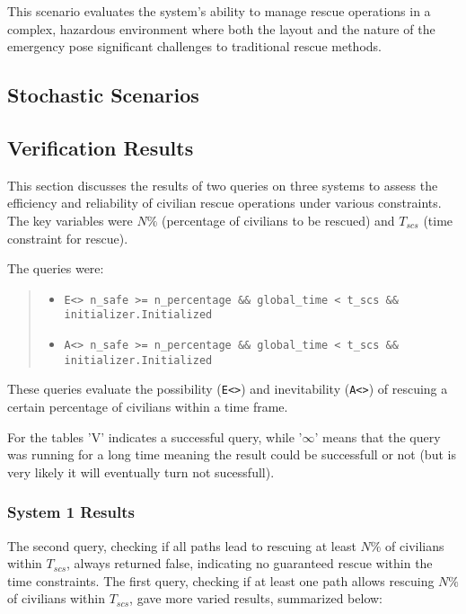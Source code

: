This scenario evaluates the system's ability to manage rescue operations in a complex, hazardous environment where both the layout and the nature of the emergency pose significant challenges to traditional rescue methods.
\subsection{Stochastic Scenarios}

\subsection{Verification Results}

This section discusses the results of two queries on three systems to assess the efficiency and reliability of civilian rescue operations under various constraints. The key variables were $N\%$ (percentage of civilians to be rescued) and $T_{scs}$ (time constraint for rescue).

The queries were:


\begin{quote}
	\raggedright
	\begin{itemize}
		\item \texttt{E<> n\_safe >= n\_percentage \&\& global\_time < t\_scs \&\& initializer.Initialized}
		\item \texttt{A<> n\_safe >= n\_percentage \&\& global\_time < t\_scs \&\& initializer.Initialized}
	\end{itemize}
\end{quote}

These queries evaluate the possibility (\texttt{E<>}) and inevitability (\texttt{A<>}) of rescuing a certain percentage of civilians within a time frame.

For the tables 'V' indicates a successful query, while '$\infty$' means that the query was running for a long time meaning the result could be successfull or not (but is very likely it will eventually turn not sucessfull). 

\subsubsection{System 1 Results}

The second query, checking if all paths lead to rescuing at least $N\%$ of civilians within $T_{scs}$, always returned false, indicating no guaranteed rescue within the time constraints. The first query, checking if at least one path allows rescuing $N\%$ of civilians within $T_{scs}$, gave more varied results, summarized below:

